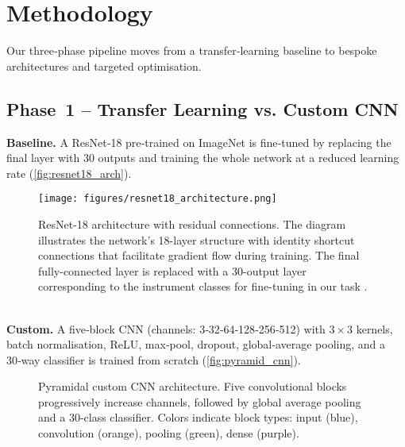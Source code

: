 
\section{Methodology}
\noindent
Our three‑phase pipeline moves from a transfer‑learning baseline to bespoke architectures and targeted optimisation.

\subsection{Phase~1 – Transfer Learning vs. Custom CNN}
\noindent
\textbf{Baseline.} A ResNet‑18 pre‑trained on ImageNet is fine‑tuned by replacing the final layer with 30 outputs and training the whole network at a reduced learning rate (\autoref{fig:resnet18_arch}).
\begin{figure}[htbp]
    \centering
    \texttt{[image: figures/resnet18\_architecture.png]}
    \caption{ResNet-18 architecture with residual connections. The diagram illustrates the network's 18-layer structure with identity shortcut connections that facilitate gradient flow during training. The final fully-connected layer is replaced with a 30-output layer corresponding to the instrument classes for fine-tuning in our task \cite{resnet18_fig}.}
    \label{fig:resnet18_arch}
\end{figure}\\  
\textbf{Custom.} A five‑block CNN (channels: 3‑32‑64‑128‑256‑512) with $3 \times 3$ kernels, batch normalisation, ReLU, max‑pool, dropout, global‑average pooling, and a 30‑way classifier is trained from scratch (\autoref{fig:pyramid_cnn}).




\begin{figure}[h!]
    \centering
    \caption{Pyramidal custom CNN architecture. Five convolutional blocks progressively increase channels, followed by global average pooling and a 30-class classifier. Colors indicate block types: input (blue), convolution (orange), pooling (green), dense (purple).}
    \label{fig:pyramid_cnn}
\end{figure}


